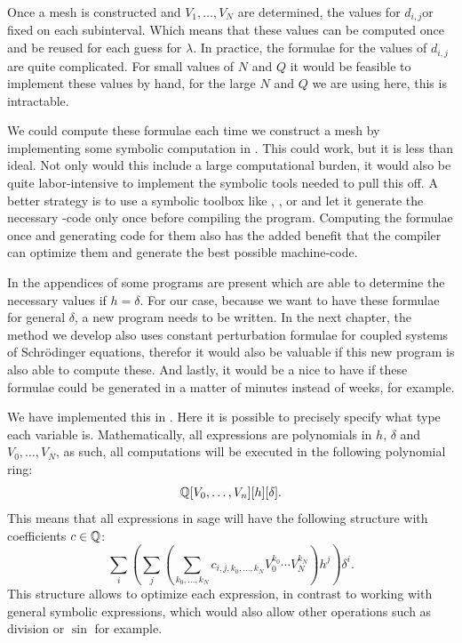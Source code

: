 Once a mesh is constructed and $V_1, \dots, V_{N}$ are determined, the values for $d_{i, j}$or fixed on each subinterval. Which means that these values can be computed once and be reused for each guess for $\lambda$. In practice, the formulae for the values of $d_{i, j}$ are quite complicated. For small values of $N$ and $Q$ it would be feasible to implement these values by hand, for the large $N$ and $Q$ we are using here, this is intractable.

We could compute these formulae each time we construct a mesh by implementing some symbolic computation in \cpp{}. This could work, but it is less than ideal. Not only would this include a large computational burden, it would also be quite labor-intensive to implement the symbolic tools needed to pull this off. A better strategy is to use a symbolic toolbox like \maple{}, \mathematica{}, or \sage{} and let it generate the necessary \cpp{}-code only once before compiling the program. Computing the formulae once and generating code for them  also has the added benefit that the \cpp{} compiler can optimize them and generate the best possible machine-code.

In the appendices of \cite{ledoux_study_2007} some \maple{} programs are present which are able to determine the necessary values if $h = \delta$. For our case, because we want to have these formulae for general $\delta$, a new program needs to be written. In the next chapter, the method we develop also uses constant perturbation formulae for coupled systems of Schrödinger equations, therefor it would also be valuable if this new program is also able to compute these. And lastly, it would be a nice to have if these formulae could be generated in a matter of minutes instead of weeks, for example.

We have implemented this in \sage{} \cite{sagemath}. Here it is possible to precisely specify what type each variable is. Mathematically, all expressions are polynomials in $h$, $\delta$ and $V_0, \dots, V_N$, as such, all computations will be executed in the following polynomial ring:
$$
    \mathbb{Q}[V_0, \dots, V_n][h][\delta]\text{.}
$$
This means that all expressions in sage will have the following structure with coefficients $c \in \mathbb{Q}$:
$$
    \sum_i \left(\sum_j \left( \sum_{k_0,\dots, k_N} c_{i,j,k_0,\dots,k_N} V_0^{k_0} \cdots V_N^{k_N}  \right)h^j \right) \delta^i\text{.}
$$
This structure allows \sage{} to optimize each expression, in contrast to working with general symbolic expressions, which would also allow other operations such as division or $\sin$ for example.


